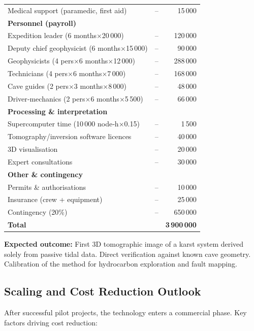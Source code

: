 \documentclass[12pt,a4paper]{article}
\theoremstyle{remark}
\begin{document}
\begin{table}[htbp]
\begin{tabular}{lrr}
			Medical support (paramedic, first aid) & – & 15\,000 \\
			\multicolumn{3}{l}{\textbf{Personnel (payroll)}} \\
			Expedition leader (6 months$\times$20\,000) & – & 120\,000 \\
			Deputy chief geophysicist (6 months$\times$15\,000) & – & 90\,000 \\
			Geophysicists (4 pers$\times$6 months$\times$12\,000) & – & 288\,000 \\
			Technicians (4 pers$\times$6 months$\times$7\,000) & – & 168\,000 \\
			Cave guides (2 pers$\times$3 months$\times$8\,000) & – & 48\,000 \\
			Driver‑mechanics (2 pers$\times$6 months$\times$5\,500) & – & 66\,000 \\
			\multicolumn{3}{l}{\textbf{Processing \& interpretation}} \\
			Supercomputer time (10\,000 node‑h$\times$0.15) & – & 1\,500 \\
			Tomography/inversion software licences & – & 40\,000 \\
			3D visualisation & – & 20\,000 \\
			Expert consultations & – & 30\,000 \\
			\multicolumn{3}{l}{\textbf{Other \& contingency}} \\
			Permits \& authorisations & – & 10\,000 \\
			Insurance (crew + equipment) & – & 25\,000 \\
			Contingency (20\%) & – & 650\,000 \\
			\midrule
			\textbf{Total} & & \textbf{3\,900\,000} \\
			\bottomrule
		\end{tabular}
	\end{table}
	
	\textbf{Expected outcome:} First 3D tomographic image of a karst system derived solely from passive tidal data. Direct verification against known cave geometry. Calibration of the method for hydrocarbon exploration and fault mapping.
	
	\subsection{Scaling and Cost Reduction Outlook}
	
	After successful pilot projects, the technology enters a commercial phase. Key factors driving cost reduction:
	
\end{document}
